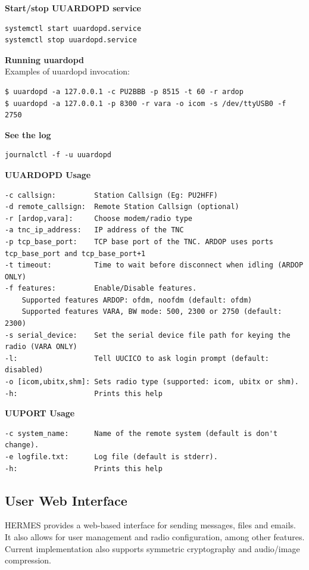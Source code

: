 \documentclass[11pt,a4paper]{article}
\begin{document}
\textbf{Start/stop UUARDOPD service}
\begin{verbatim}
systemctl start uuardopd.service
systemctl stop uuardopd.service
\end{verbatim}

\textbf{Running uuardopd}\\

Examples of uuardopd invocation:

\begin{verbatim}
$ uuardopd -a 127.0.0.1 -c PU2BBB -p 8515 -t 60 -r ardop
$ uuardopd -a 127.0.0.1 -p 8300 -r vara -o icom -s /dev/ttyUSB0 -f 2750  
\end{verbatim}


\textbf{See the log}
\begin{verbatim}
journalctl -f -u uuardopd
\end{verbatim}

\textbf{UUARDOPD Usage}
\begin{verbatim}
-c callsign:         Station Callsign (Eg: PU2HFF)
-d remote_callsign:  Remote Station Callsign (optional)
-r [ardop,vara]:     Choose modem/radio type
-a tnc_ip_address:   IP address of the TNC
-p tcp_base_port:    TCP base port of the TNC. ARDOP uses ports tcp_base_port and tcp_base_port+1
-t timeout:          Time to wait before disconnect when idling (ARDOP ONLY)
-f features:         Enable/Disable features.
    Supported features ARDOP: ofdm, noofdm (default: ofdm)
    Supported features VARA, BW mode: 500, 2300 or 2750 (default: 2300)
-s serial_device:    Set the serial device file path for keying the radio (VARA ONLY)
-l:                  Tell UUCICO to ask login prompt (default: disabled)
-o [icom,ubitx,shm]: Sets radio type (supported: icom, ubitx or shm).
-h:                  Prints this help
\end{verbatim}

\textbf{UUPORT Usage}
\begin{verbatim}
-c system_name:      Name of the remote system (default is don't change).
-e logfile.txt:      Log file (default is stderr).
-h:                  Prints this help
\end{verbatim}
\subsection{User Web Interface}

HERMES provides a web-based interface for sending messages, files and emails. It also allows for user management and radio configuration, among other features.
Current implementation also supports symmetric cryptography and audio/image compression.
\end{document}
